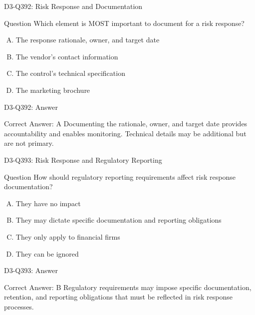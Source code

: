 \documentclass{beamer}
\begin{document}
\begin{frame}{D3-Q392: Risk Response and Documentation}
	\begin{block}{Question}
		Which element is MOST important to document for a risk response?
	\end{block}
	\begin{enumerate}[(A)]
		\item The response rationale, owner, and target date
		\item The vendor's contact information
		\item The control's technical specification
		\item The marketing brochure
	\end{enumerate}
\end{frame}
\begin{frame}{D3-Q392: Answer}
	\begin{block}{Correct Answer: A}
		Documenting the rationale, owner, and target date provides accountability and enables monitoring. Technical details may be additional but are not primary.
	\end{block}
\end{frame}

\begin{frame}{D3-Q393: Risk Response and Regulatory Reporting}
	\begin{block}{Question}
		How should regulatory reporting requirements affect risk response documentation?
	\end{block}
	\begin{enumerate}[(A)]
		\item They have no impact
		\item They may dictate specific documentation and reporting obligations
		\item They only apply to financial firms
		\item They can be ignored
	\end{enumerate}
\end{frame}
\begin{frame}{D3-Q393: Answer}
	\begin{block}{Correct Answer: B}
		Regulatory requirements may impose specific documentation, retention, and reporting obligations that must be reflected in risk response processes.
	\end{block}
\end{frame}
\end{document}
